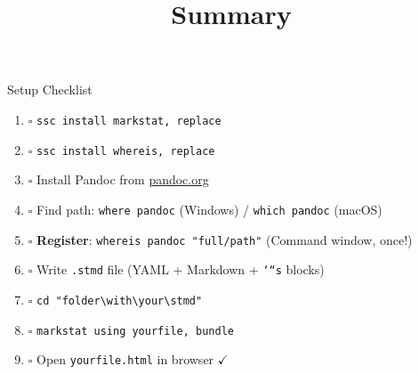 \documentclass[dvipsnames,hyperref={pdfpagelabels=false}]{beamer}
\begin{document}
\title[]{Summary}
\author{}\institute{}\date{}
\begin{frame}{}
  \titlepage
\end{frame}

\begin{frame}{Setup Checklist}
  \begin{enumerate}
    \item $\square$ \texttt{ssc install markstat, replace}
    \item $\square$ \texttt{ssc install whereis, replace}
    \item $\square$ Install Pandoc from \url{pandoc.org}
    \item $\square$ Find path: \texttt{where pandoc} (Windows) / \texttt{which pandoc} (macOS)
    \item $\square$ \textbf{Register}: \texttt{whereis pandoc "full/path"} \quad
          (Command window, once!)
    \item $\square$ Write \texttt{.stmd} file (YAML + Markdown + \texttt{`{}``s} blocks)
    \item $\square$ \texttt{cd "folder\textbackslash with\textbackslash your\textbackslash stmd"}
    \item $\square$ \texttt{markstat using yourfile, bundle}
    \item $\square$ Open \texttt{yourfile.html} in browser $\checkmark$
  \end{enumerate}
\end{frame}
\end{document}
